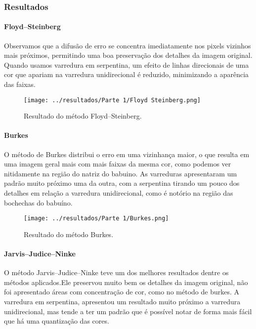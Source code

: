 \documentclass[12pt,a4paper]{article}
\begin{document}
\subsubsection*{Resultados}

\paragraph{Floyd–Steinberg}
Observamos que a difusão de erro se concentra imediatamente nos pixels vizinhos mais próximos, permitindo uma boa preservação dos detalhes da imagem original. Quando usamos varredura em serpentina, um efeito de linhas direcionais de uma cor que apariam na varredura unidirecional é reduzido, minimizando a aparência das faixas.

\begin{figure}[H]
  \centering
  \texttt{[image: ../resultados/Parte 1/Floyd Steinberg.png]}
  \caption{Resultado do método Floyd–Steinberg.}
  \label{fig:fs}
\end{figure}

\paragraph{Burkes}
O método de Burkes distribui o erro em uma vizinhança maior, o que resulta em uma imagem geral mais com mais faixas da mesma cor, como podemos ver nitidamente na região do natriz do babuino. As varreduras apresentaram um padrão muito próximo uma da outra, com a serpentina tirando um pouco dos detalhes em relação a varredura unidirecional, como é notório na região das bochechas do babuíno.

\begin{figure}[H]
  \centering
  \texttt{[image: ../resultados/Parte 1/Burkes.png]}
  \caption{Resultado do método Burkes.}
  \label{fig:burkes}
\end{figure}


\paragraph{Jarvis–Judice–Ninke}
O método Jarvis–Judice–Ninke teve um dos melhores resultados dentre os métodos aplicados.Ele preservou muito bem os detalhes da imagem original, não foi apresentado áreas com concentração de cor, como no método de burkes. A varredura em serpentina, apresentou um resultado muito próximo a varredura unidirecional, mas tende a ter um padrão que é possível notar de forma mais fácil que há uma quantização das cores.
\end{document}
